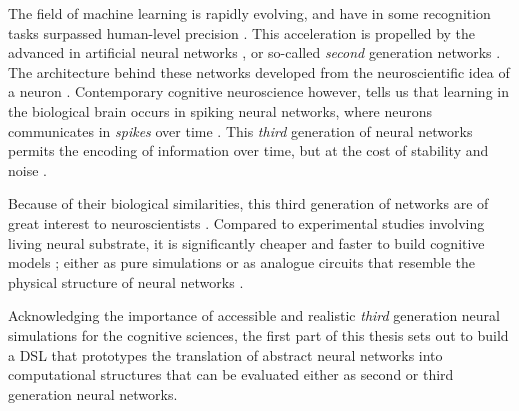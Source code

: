 \documentclass[report.tex]{subfiles}
\begin{document}
The field of machine learning is rapidly evolving, and have in
some recognition tasks surpassed human-level precision
\autocite{Schmidhuber2014}.
This acceleration is propelled by the advanced in artificial neural
networks \autocite{Rumelhart1988, Schmidhuber2014, Nilsson2009}, or
so-called \textit{second} generation networks \cite{Maass1997}.
The architecture behind these networks developed from the neuroscientific
idea of a neuron \autocite{Nilsson2009, Russel2007}.
Contemporary cognitive neuroscience however, tells us that learning in
the biological brain occurs in spiking neural networks, where neurons
communicates in \textit{spikes} over time \cite{Dayan2001, Eliasmith2004}.
This \textit{third} generation of neural networks permits the encoding
of information over time, but at the cost of stability and 
noise \autocite{Maass1997}.

Because of their biological similarities, this third generation of
networks are of great interest to neuroscientists
\autocite{Dayan2001,Bruderle2011,Eliasmith2015}.
Compared to experimental studies involving living neural substrate,
it is significantly cheaper and faster to build cognitive 
models \autocite{Eliasmith2015}; either as pure simulations
\autocite{Davison2009} or as analogue circuits
that resemble the physical structure of neural networks
\autocite{Walter2015, Schmitt2017}.




Acknowledging the importance of accessible and realistic \textit{third} 
generation neural simulations for the cognitive sciences, the first
part of this thesis
sets out to build a \gls{DSL} that prototypes the translation of
abstract neural networks into computational structures that
can be evaluated either as second or third generation neural networks.
\end{document}
